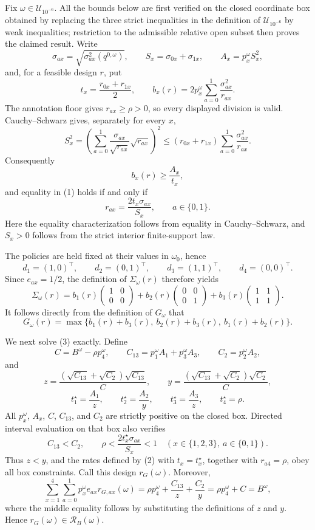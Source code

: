 Fix \(\omega\in\mathcal U_{10^{-6}}\).  All the bounds below are first verified on the closed coordinate box obtained by replacing the three strict inequalities in the definition of \(\mathcal U_{10^{-6}}\) by weak inequalities; restriction to the admissible relative open subset then proves the claimed result.  Write
\[
 \sigma_{ax}=\sqrt{\sigma^2_{ax}(q^{0,\omega})},\qquad
 S_x=\sigma_{0x}+\sigma_{1x},\qquad
 A_x=p_x^\omega S_x^2,
\]
and, for a feasible design \(r\), put
\[
 t_x=\frac{r_{0x}+r_{1x}}2,
 \qquad
 b_x(r)=2p_x^\omega\sum_{a=0}^1\frac{\sigma_{ax}^2}{r_{ax}}.
\]
The annotation floor gives \(r_{ax}\geq\rho>0\), so every displayed division is valid.  Cauchy--Schwarz gives, separately for every \(x\),
\[
 S_x^2
 =\left(\sum_{a=0}^1\frac{\sigma_{ax}}{\sqrt{r_{ax}}}\sqrt{r_{ax}}\right)^2
 \leq (r_{0x}+r_{1x})\sum_{a=0}^1\frac{\sigma_{ax}^2}{r_{ax}}.
\]
Consequently
\[
 b_x(r)\geq \frac{A_x}{t_x},
 \tag{1}
\]
and equality in (1) holds if and only if
\[
 r_{ax}=\frac{2t_x\sigma_{ax}}{S_x},\qquad a\in\{0,1\}.
 \tag{2}
\]
Here the equality characterization follows from equality in Cauchy--Schwarz, and \(S_x>0\) follows from the strict interior finite-support law.

The policies are held fixed at their values in \(\omega_0\), hence
\[
 d_1=(1,0)^\top,\qquad d_2=(0,1)^\top,
 \qquad d_3=(1,1)^\top,\qquad d_4=(0,0)^\top.
\]
Since \(e_{ax}=1/2\), the definition of \(\Sigma_\omega(r)\) therefore yields
\[
 \Sigma_\omega(r)
 =b_1(r)\begin{pmatrix}1&0\\0&0\end{pmatrix}
 +b_2(r)\begin{pmatrix}0&0\\0&1\end{pmatrix}
 +b_3(r)\begin{pmatrix}1&1\\1&1\end{pmatrix}.
\]
It follows directly from the definition of \(G_\omega\) that
\[
 G_\omega(r)
 =\max\{b_1(r)+b_3(r),\ b_2(r)+b_3(r),\ b_1(r)+b_2(r)\}.
 \tag{3}
\]

We next solve (3) exactly.  Define
\[
 C=B^\omega-\rho p_4^\omega,
 \qquad C_{13}=p_1^\omega A_1+p_3^\omega A_3,
 \qquad C_2=p_2^\omega A_2,
\]
and
\[
 z=\frac{(\sqrt{C_{13}}+\sqrt{C_2})\sqrt{C_{13}}}{C},
 \qquad
 y=\frac{(\sqrt{C_{13}}+\sqrt{C_2})\sqrt{C_2}}{C},
\]
\[
 t_1^\star=\frac{A_1}{z},\qquad
 t_2^\star=\frac{A_2}{y},\qquad
 t_3^\star=\frac{A_3}{z},\qquad
 t_4^\star=\rho.
 \tag{4}
\]
All \(p_x^\omega\), \(A_x\), \(C\), \(C_{13}\), and \(C_2\) are strictly positive on the closed box.  Directed interval evaluation on that box also verifies
\[
 C_{13}<C_2,
 \qquad
 \rho<\frac{2t_x^\star\sigma_{ax}}{S_x}<1
 \quad (x\in\{1,2,3\},\ a\in\{0,1\}).
 \tag{5}
\]
Thus \(z<y\), and the rates defined by (2) with \(t_x=t_x^\star\), together with \(r_{a4}=\rho\), obey all box constraints.  Call this design \(r_G(\omega)\).  Moreover,
\[
 \sum_{x=1}^4\sum_{a=0}^1p_x^\omega e_{ax}r_{G,ax}(\omega)
 =\rho p_4^\omega+\frac{C_{13}}z+\frac{C_2}y
 =\rho p_4^\omega+C
 =B^\omega,
 \tag{6}
\]
where the middle equality follows by substituting the definitions of \(z\) and \(y\).  Hence \(r_G(\omega)\in\mathcal R_B(\omega)\).

